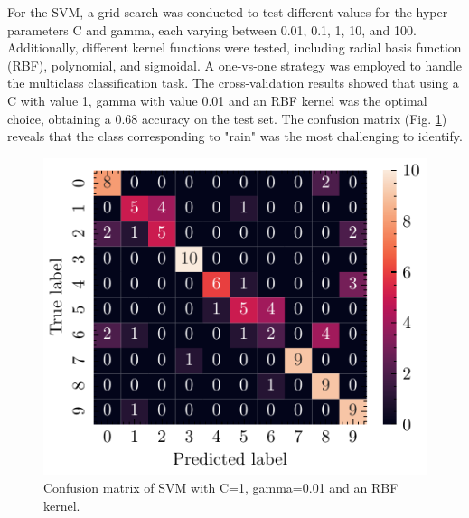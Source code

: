 \documentclass[journal]{IEEEtran}
\begin{document}
For the SVM, a grid search was conducted to test different values for the hyper-parameters C and gamma, each varying between 0.01, 0.1, 1, 10, and 100. Additionally, different kernel functions were tested, including radial basis function (RBF), polynomial, and sigmoidal. A one-vs-one strategy was employed to handle the multiclass classification task.
The cross-validation results showed that using a C with value 1, gamma with value 0.01 and an RBF kernel was the optimal choice, obtaining a 0.68 accuracy on the test set. The confusion matrix (Fig. \ref{fig:svm_confusion_matrix}) reveals that the class corresponding to "rain" was the most challenging to identify.
\begin{figure}[ht]
    \centering
    \includegraphics[width=\linewidth]{confusion_matrix_svm.pdf}
    \caption{Confusion matrix of SVM with C=1, gamma=0.01 and an RBF kernel.}
    \label{fig:svm_confusion_matrix}
\end{figure}
\end{document}
